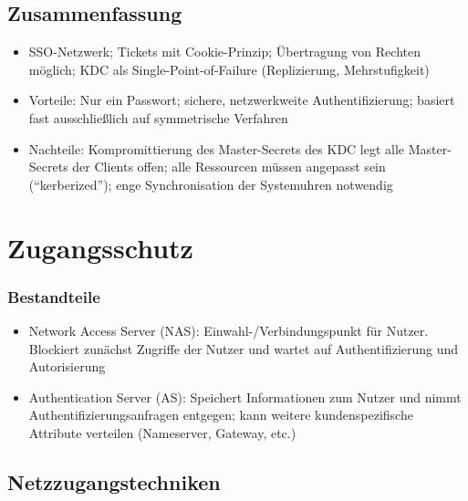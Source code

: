 \subsection{Zusammenfassung}
\begin{itemize}
	\item SSO-Netzwerk; Tickets mit Cookie-Prinzip; Übertragung von Rechten möglich; KDC als Single-Point-of-Failure (Replizierung, Mehrstufigkeit)
	\item Vorteile: Nur ein Passwort; sichere, netzwerkweite Authentifizierung; basiert fast ausschließlich auf symmetrische Verfahren
	\item Nachteile: Kompromittierung des Master-Secrets des KDC legt alle Master-Secrets der Clients offen; alle Ressourcen müssen angepasst sein ("`kerberized"'); enge Synchronisation der Systemuhren notwendig
\end{itemize}



\section{Zugangsschutz}

\subsubsection{Bestandteile}
\begin{itemize}
	\item Network Access Server (NAS): Einwahl-/Verbindungspunkt für Nutzer. Blockiert zunächst Zugriffe der Nutzer und wartet auf Authentifizierung und Autorisierung
	\item Authentication Server (AS): Speichert Informationen zum Nutzer und nimmt Authentifizierungsanfragen entgegen; kann weitere kundenspezifische Attribute verteilen (Nameserver, Gateway, etc.)
\end{itemize}


\subsection{Netzzugangstechniken}

